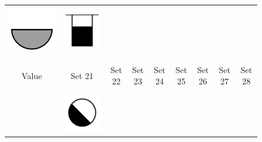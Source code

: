 \documentclass[doc]{apa6}
\newcommand{\stimulusscale}{.1}
\begin{document}
\begin{figure}[t]
\begin{center}
\begin{tabular}{c|cccccccc}
\includegraphics[scale=\stimulusscale]{./set19stim75.png} &
\includegraphics[scale=\stimulusscale]{./set20stim75.png} \\
\multicolumn{1}{c}{}\\
\multicolumn{1}{c}{}\\
Value & Set 21 & Set 22 & Set 23 & Set 24 & Set 25 & Set 26 & Set 27 & Set 28 \\[6pt] \hline
\\
 \raisebox{.75cm}{55}  &
\includegraphics[scale=\stimulusscale]{./set21stim55.png} &

\end{tabular}
\end{center}
\end{figure}
\end{document}
